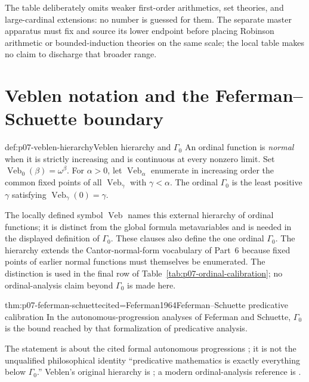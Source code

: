 The table deliberately omits weaker first-order arithmetics, set theories,
and large-cardinal extensions: no number is guessed for them.  The separate
master apparatus must fix and source its lower endpoint before placing
Robinson arithmetic or bounded-induction theories on the same scale; the local
table makes no claim to discharge that broader range.

\section{Veblen notation and the Feferman--Schuette boundary}
\label{sec:p07-veblen}

\begin{hbdefinition}{def:p07-veblen-hierarchy}{Veblen hierarchy and \(\Gamma_0\)}
An ordinal function is \emph{normal} when it is strictly increasing and is
continuous at every nonzero limit.  Set
\(\operatorname{Veb}_0(\beta)=\omega^\beta\).  For \(\alpha>0\), let
\(\operatorname{Veb}_\alpha\) enumerate in increasing order the common fixed
points of all \(\operatorname{Veb}_\gamma\) with \(\gamma<\alpha\).  The
ordinal \(\Gamma_0\) is
the least positive \(\gamma\) satisfying
\(\operatorname{Veb}_\gamma(0)=\gamma\).

The locally defined symbol \(\operatorname{Veb}\) names this external
hierarchy of ordinal functions; it is distinct from the global formula
metavariables and is needed in the displayed definition of \(\Gamma_0\).
These clauses also define the one ordinal \(\Gamma_0\).  The hierarchy extends
the Cantor-normal-form vocabulary of Part~6 because
fixed points of earlier normal functions must themselves be enumerated.  The
distinction is used in the final row of
Table~\ref{tab:p07-ordinal-calibration}; no ordinal-analysis claim beyond
\(\Gamma_0\) is made here.
\end{hbdefinition}

\begin{hbtheorem}{thm:p07-feferman-schuette}{cited=Feferman1964}{Feferman--Schuette predicative calibration}
In the autonomous-progression analyses of Feferman and Schuette,
\(\Gamma_0\) is the bound reached by that formalization of predicative
analysis.
\end{hbtheorem}

The statement is about the cited formal autonomous progressions
\cite{Feferman1964,Schuette1977}; it is not the unqualified philosophical
identity ``predicative mathematics is exactly everything below
\(\Gamma_0\).''  Veblen's original hierarchy is \cite{Veblen1908}; a modern
ordinal-analysis reference is \cite{Pohlers2009}.

